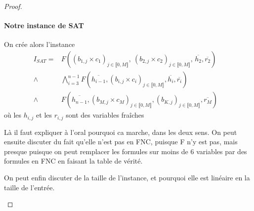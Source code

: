 \begin{proof}
	\paragraph{Notre instance de SAT} On crée alors l'instance 
	$$\begin{array}{rll}
		I_{SAT} = & F\left( \left( b_{1,j} \times c_1 \right)_{j \in  \llbracket0, M \rrbracket}, \: \left( b_{2,j} \times c_2 \right)_{j \in  \llbracket0, M \rrbracket}, \, \overline{h_2}, \overline{r_2} \right) & \\
		\wedge & \bigwedge\limits_{i = 3}^{n-1} F\left( \overline{h_{i-1}}, \left( b_{i,j} \times c_i \right)_{j \in  \llbracket0, M \rrbracket}, \overline{h_i}, \overline{r_i} \right) & \\
		\wedge & F\left( \overline{h_{n-1}}, \left( b_{M,j} \times c_M \right)_{j \in  \llbracket0, M \rrbracket}, \left( b_{K,j}  \right)_{j \in  \llbracket0, M \rrbracket}, \overline{r_M} \right) &
	\end{array}
	$$
	où les $h_{i,j}$ et les $r_{i,j}$ sont des variables fraîches
	
	\begin{com}
		Là il faut expliquer à l'oral pourquoi ca marche, dans les deux sens. On peut ensuite discuter du fait qu'elle n'est pas en FNC, puisque F n'y est pas, mais presque puisque on peut remplacer les formules sur moins de 6 variables par des formules en FNC en faisant la table de vérité.
		
		On peut enfin discuter de la taille de l'instance, et pourquoi elle est linéaire en la taille de l'entrée.
	\end{com}

\end{proof}

